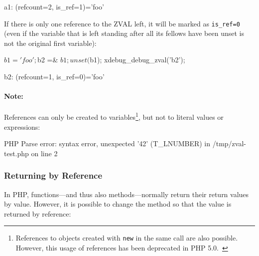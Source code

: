 \begin{textcode}
a1: (refcount=2, is_ref=1)='foo'
\end{textcode}

If there is only one reference to the ZVAL left, it will be marked as \texttt{is\_ref=0} (even if the variable that is left standing after all its fellows have been unset is not the original first variable):

\begin{phpcode}
$b1 = 'foo';
$b2 =& $b1;
unset($b1);
xdebug_debug_zval('b2');
\end{phpcode}

\begin{textcode}
b2: (refcount=1, is_ref=0)='foo'
\end{textcode}

\paragraph{Note:} References can only be created to variables\footnote{References to objects created with \texttt{new} in the same call are also possible. However, this usage of references has been deprecated in PHP 5.0.~\cite{php-manual-what-references-do}}, but not to literal values or expressions:


\begin{textcode}
PHP Parse error:  syntax error, unexpected '42' (T_LNUMBER) in
  /tmp/zval-test.php on line 2
\end{textcode}


\subsubsection{Returning by Reference}

In PHP, functions---and thus also methods---normally return their return values by value. However, it is possible to change the method so that the value is returned by reference:~\cite{php-manual-returning-reference}


